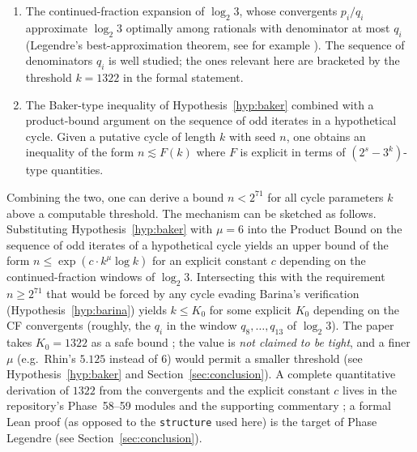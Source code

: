 \begin{enumerate}
  \item The continued-fraction expansion of \(\log_2 3\), whose
        convergents \(p_i / q_i\) approximate \(\log_2 3\) optimally
        among rationals with denominator at most \(q_i\) (Legendre's
        best-approximation theorem, see for example
        \cite{HardyWright1979,Khinchin1964}). The sequence of denominators
        \(q_i\) is well studied; the ones relevant here are bracketed by
        the threshold \(k = 1322\) in the formal statement.
  \item The Baker-type inequality of Hypothesis~\ref{hyp:baker} combined
        with a product-bound argument on the sequence of odd iterates in
        a hypothetical cycle. Given a putative cycle of length \(k\)
        with seed \(n\), one obtains an inequality of the form
        \(n \lesssim F(k)\) where \(F\) is explicit in terms of
        \((2^s - 3^k)\)-type quantities.
\end{enumerate}

Combining the two, one can derive a bound \(n < 2^{71}\) for all cycle
parameters \(k\) above a computable threshold. The mechanism can be
sketched as follows. Substituting Hypothesis~\ref{hyp:baker} with
\(\mu = 6\) into the Product Bound on the sequence of odd iterates of a
hypothetical cycle yields an upper bound of the form
\(n \leq \exp(c \cdot k^\mu \log k)\) for an explicit constant \(c\)
depending on the continued-fraction windows of \(\log_2 3\). Intersecting
this with the requirement \(n \geq 2^{71}\) that would be forced by any
cycle evading Barina's verification
(Hypothesis~\ref{hyp:barina}) yields
\(k \leq K_0\) for some explicit \(K_0\) depending on the CF convergents
(roughly, the \(q_i\) in the window \(q_8, \ldots, q_{13}\) of
\(\log_2 3\)). The paper takes \(K_0 = 1322\) as a safe bound ; the
value is \emph{not claimed to be tight}, and a finer \(\mu\)
(e.g.\ Rhin's \(5.125\) instead of \(6\)) would permit a smaller threshold
(see Hypothesis~\ref{hyp:baker} and Section~\ref{sec:conclusion}). A
complete quantitative derivation of \(1322\) from the convergents and the
explicit constant \(c\) lives in the repository's Phase~58--59 modules
and the supporting commentary ; a formal Lean proof (as opposed to the
\texttt{structure} used here) is the target of Phase Legendre (see
Section~\ref{sec:conclusion}).


